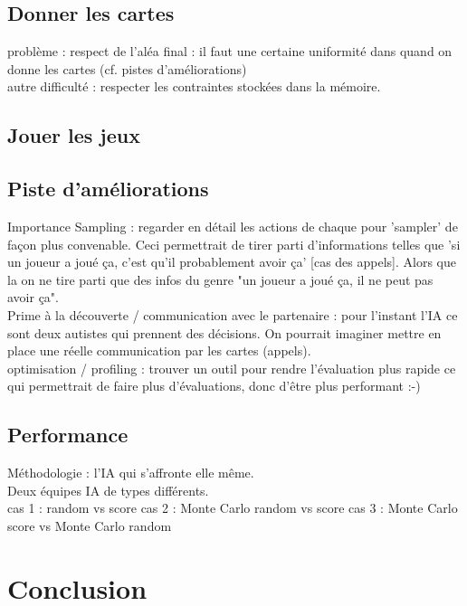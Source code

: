 \documentclass[a4paper,11pt]{article}
\begin{document}
\subsection{Donner les cartes \label{sec:giveCards}}
problème : respect de l'aléa final : il faut une certaine uniformité dans quand on donne les cartes (cf. pistes d'améliorations) \\

autre difficulté : respecter les contraintes stockées dans la mémoire.
\subsection{Jouer les jeux}
\subsection{Piste d'améliorations}
Importance Sampling : regarder en détail les actions de chaque pour 'sampler' de façon plus convenable. Ceci permettrait de tirer parti d'informations telles que 'si un joueur a joué ça, c'est qu'il probablement avoir ça' [cas des appels]. Alors que la on ne tire parti que des infos du genre "un joueur a joué ça, il ne peut pas avoir ça".  \\

Prime à la découverte / communication avec le partenaire : pour l'instant l'IA ce sont deux autistes qui prennent des décisions. On pourrait imaginer mettre en place une réelle communication par les cartes (appels). \\

optimisation / profiling : trouver un outil pour rendre l'évaluation plus rapide ce qui permettrait de faire plus d'évaluations, donc d'être plus performant :-)
\subsection{Performance}
Méthodologie : l'IA qui s'affronte elle même. \\
Deux équipes IA de types différents. \\
cas 1 : random vs score
cas 2 : Monte Carlo random vs score
cas 3 : Monte Carlo score vs Monte Carlo random

\clearpage
\section*{Conclusion}
\end{document}
